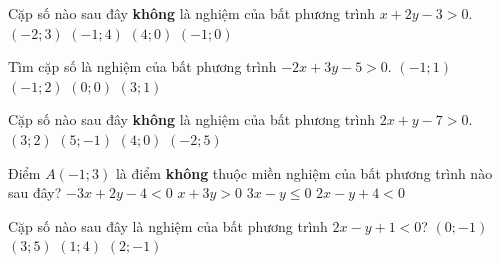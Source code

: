 

\begin{ex}%
	Cặp số nào sau đây \textbf{không} là nghiệm của  bất phương trình $x+2y-3>0$.
	 \choice
		 {$\left(-2;3\right)$}
		{$\left(-1;4\right)$} 
		 {$\left(4;0\right)$}
		{\True$\left(-1;0\right)$} 
\end{ex}

\begin{ex}%
	Tìm cặp số  là nghiệm của bất phương trình $-2x+3y-5>0$.
	\choice 
		{$\left(-1;1\right)$} 
		{\True $\left(-1;2\right)$} 
		{$\left(0;0\right)$} 
		{$\left(3;1\right)$} 
\end{ex}

\begin{ex}%
	Cặp số nào sau đây \textbf{không} là nghiệm của bất phương trình  $2x+y-7>0$.
	 \choice
		 {$\left(3;2\right)$}
		 {$\left(5;-1\right)$}
		 {$\left(4;0\right)$}
		{\True $\left(-2;5\right)$} 
\end{ex}

\begin{ex}%
	Điểm $A(-1;3)$ là điểm \textbf{không} thuộc  miền nghiệm của bất phương trình nào sau đây?
	\choice 
		 {\True $-3x+2y-4<0$}
		{$x+3y>0$} 
		{$3x-y \le 0$} 
		 {$2x-y+4<0$}
\end{ex}

\begin{ex}%
	Cặp số nào  sau đây là nghiệm của bất phương trình $2x-y+1<0$?
	\choice 
		{$\left(0;-1\right)$} 
		{$\left(3;5\right)$} 
		{\True $\left(1;4\right)$} 
		{$\left(2;-1\right)$} 
\end{ex}

